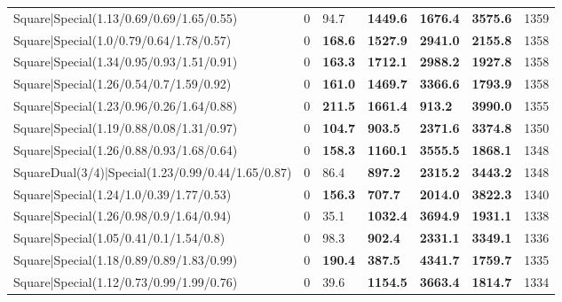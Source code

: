 \begin{tabular}{lrllllr}
 Square|Special(1.13/0.69/0.69/1.65/0.55)                      &             0   & 94.7           & \textbf{1449.6} & \textbf{1676.4} & \textbf{3575.6} &         1359 \\
 Square|Special(1.0/0.79/0.64/1.78/0.57)                       &             0   & \textbf{168.6} & \textbf{1527.9} & \textbf{2941.0} & \textbf{2155.8} &         1358 \\
 Square|Special(1.34/0.95/0.93/1.51/0.91)                      &             0   & \textbf{163.3} & \textbf{1712.1} & \textbf{2988.2} & \textbf{1927.8} &         1358 \\
 Square|Special(1.26/0.54/0.7/1.59/0.92)                       &             0   & \textbf{161.0} & \textbf{1469.7} & \textbf{3366.6} & \textbf{1793.9} &         1358 \\
 Square|Special(1.23/0.96/0.26/1.64/0.88)                      &             0   & \textbf{211.5} & \textbf{1661.4} & \textbf{913.2}  & \textbf{3990.0} &         1355 \\
 Square|Special(1.19/0.88/0.08/1.31/0.97)                      &             0   & \textbf{104.7} & \textbf{903.5}  & \textbf{2371.6} & \textbf{3374.8} &         1350 \\
 Square|Special(1.26/0.88/0.93/1.68/0.64)                      &             0   & \textbf{158.3} & \textbf{1160.1} & \textbf{3555.5} & \textbf{1868.1} &         1348 \\
 SquareDual(3/4)|Special(1.23/0.99/0.44/1.65/0.87)             &             0   & 86.4           & \textbf{897.2}  & \textbf{2315.2} & \textbf{3443.2} &         1348 \\
 Square|Special(1.24/1.0/0.39/1.77/0.53)                       &             0   & \textbf{156.3} & \textbf{707.7}  & \textbf{2014.0} & \textbf{3822.3} &         1340 \\
 Square|Special(1.26/0.98/0.9/1.64/0.94)                       &             0   & 35.1           & \textbf{1032.4} & \textbf{3694.9} & \textbf{1931.1} &         1338 \\
 Square|Special(1.05/0.41/0.1/1.54/0.8)                        &             0   & 98.3           & \textbf{902.4}  & \textbf{2331.1} & \textbf{3349.1} &         1336 \\
 Square|Special(1.18/0.89/0.89/1.83/0.99)                      &             0   & \textbf{190.4} & \textbf{387.5}  & \textbf{4341.7} & \textbf{1759.7} &         1335 \\
 Square|Special(1.12/0.73/0.99/1.99/0.76)                      &             0   & 39.6           & \textbf{1154.5} & \textbf{3663.4} & \textbf{1814.7} &         1334 \\

\end{tabular}
